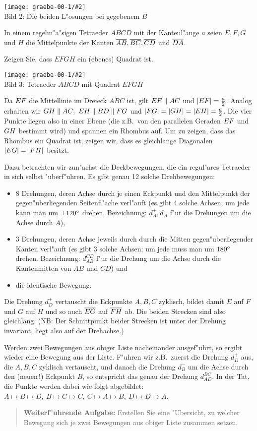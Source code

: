\documentclass[11pt]{article}
\newcommand{\Bild}[3]{
\begin{center}
\texttt{[image: graebe-00-1/\#2]}\nopagebreak\\[12pt] #3
\end{center}
}
\begin{document}
\Bild{width=12cm}{Bild2}{Bild 2: Die beiden L"osungen bei gegebenem $B$}

\begin{aufgabe}
  In einem regelm"a"sigen Tetraeder $ABCD$ mit der Kantenl"ange $a$ seien
  $E,F,G$ und $H$ die Mittelpunkte der Kanten $\overline{{\mathnormal{AB}}}, \overline{{\mathnormal{BC}}},
  \overline{{\mathnormal{CD}}}$ und $\overline{{\mathnormal{DA}}}$.

Zeigen Sie, dass $EFGH$ ein (ebenes) Quadrat ist.
\end{aufgabe}

\Bild{width=12cm}{Bild3}{Bild 3: Tetraeder $ABCD$ mit Quadrat $EFGH$}

Da ${\mathnormal{EF}}$ die Mittellinie im Dreieck $ABC$ ist, gilt
${\mathnormal{EF}}\parallel {\mathnormal{AC}}$ und $\left\vert {\mathnormal{EF}}\right\vert=\frac{a}{2}$. Analog
erhalten wir $\kline{GH}\parallel \kline{AC},\ \kline{EH}\parallel
\kline{BD}\parallel \kline{FG}$ und
$\left\vert {\mathnormal{FG}}\right\vert=\left\vert {\mathnormal{GH}}\right\vert=\left\vert {\mathnormal{EH}}\right\vert=\frac{a}{2}$. Die vier Punkte
liegen also in einer Ebene (die z.B.\ von den parallelen Geraden ${\mathnormal{EF}}$
und ${\mathnormal{GH}}$ bestimmt wird) und spannen ein Rhombus auf. Um zu zeigen,
dass das Rhombus ein Quadrat ist, zeigen wir, dass es gleichlange Diagonalen
$\left\vert {\mathnormal{EG}}\right\vert=\left\vert {\mathnormal{FH}}\right\vert$ besitzt.

Dazu betrachten wir zun"achst die Deckbewegungen, die ein regul"ares Tetraeder
in sich selbst "uberf"uhren. Es gibt genau 12 solche Drehbewegungen:
\begin{itemize}
\item[(1)] 8 Drehungen, deren Achse durch je einen Eckpunkt und den
  Mittelpunkt der gegen"uberliegenden Seitenfl"ache verl"auft (es gibt 4
  solche Achsen; um jede kann man um $\pm 120^{\circ}$ drehen. Bezeichnung:
  $d_A^+, d_A^-$ f"ur die Drehungen um die Achse durch $A$),
\item[(2)] 3 Drehungen, deren Achse jeweils durch durch die Mitten
  gegen"uberliegender Kanten verl"auft (es gibt 3 solche Achsen; um jede muss
  man um $180^{\circ}$ drehen. Bezeichnung: $d_{AB}^{CD}$ f"ur die Drehung um die
  Achse durch die Kantenmitten von $AB$ und $CD$) und
\item[(3)] die identische Bewegung.
\end{itemize}
Die Drehung $d_D^+$ vertauscht die Eckpunkte $A,B,C$ zyklisch, bildet damit
$E$ auf $F$ und $G$ auf $H$ und so auch $\overline{{\mathnormal{EG}}}$ auf $\overline{{\mathnormal{FH}}}$
ab. Die beiden Strecken sind also gleichlang. (NB: Der Schnittpunkt beider
Strecken ist unter der Drehung invariant, liegt also auf der Drehachse.)
\medskip

Werden zwei Bewegungen aus obiger Liste nacheinander ausgef"uhrt, so ergibt
wieder eine Bewegung aus der Liste. F"uhren wir z.B.\ zuerst die Drehung
$d_D^+$ aus, die $A,B,C$ zyklisch vertauscht, und danach die Drehung $d_B^-$
um die Achse durch den (neuen\,!) Eckpunkt $B$, so entspricht das genau der
Drehung $d_{AD}^{BC}$.  In der Tat, die Punkte werden dabei wie folgt
abgebildet: $A\mapsto B\mapsto D,\ B\mapsto C\mapsto C,\ C\mapsto A\mapsto B,\ 
D\mapsto D\mapsto A$.
\begin{quote}
  {\bf Weiterf"uhrende Aufgabe:} Erstellen Sie eine "Ubersicht, zu welcher
  Bewegung sich je zwei Bewegungen aus obiger Liste zusammen setzen.
\end{quote}
\medskip
\end{document}
